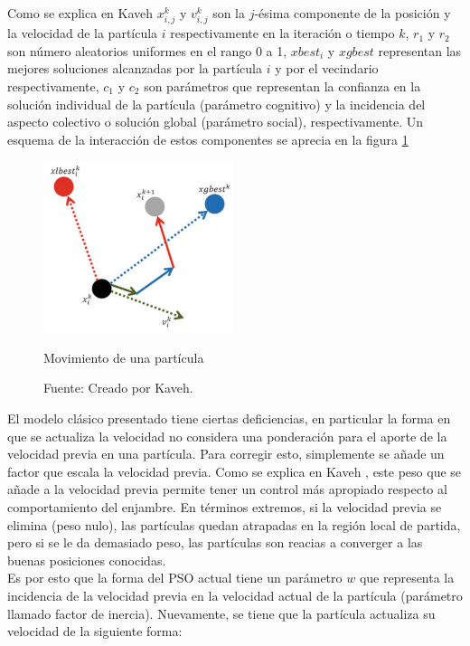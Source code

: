Como se explica en Kaveh \cite{Psoexplain14} $x_{i,j}^{k}$ y $v_{i,j}^{k}$ son la $j$-ésima componente de la posición y la velocidad de la partícula $i$ respectivamente en la iteración o tiempo $k$, $r_{1}$ y $r_{2}$ son número aleatorios uniformes en el rango 0 a 1, $xbest_i$ y $xgbest$ representan las mejores soluciones alcanzadas por la partícula $i$ y por el vecindario respectivamente, $c_1$ y $c_2$ son parámetros que representan la confianza en la solución individual de la partícula (parámetro cognitivo) y la incidencia del aspecto colectivo o solución global (parámetro social), respectivamente. Un esquema de la interacción de estos componentes se aprecia en la figura \ref{fig:move_part}\\
\begin{figure}[h!]
    \centering    
    \includegraphics[height=50mm]{figures/move_particle.png} 
    \caption{Movimiento de una partícula}
    \vspace{-.25cm} 
    \caption*{Fuente: Creado por Kaveh\cite{Psoexplain14}.}
    \label{fig:move_part}
\end{figure}
El modelo clásico presentado tiene ciertas deficiencias, en particular la forma en que se actualiza la velocidad no considera una ponderación para el aporte de la velocidad previa en una partícula. Para corregir esto, simplemente se añade un factor que escala la velocidad previa. Como se explica en Kaveh \cite{Psoexplain14}, este peso que se añade a la velocidad previa permite tener un control más apropiado respecto al comportamiento del enjambre. En términos extremos, si la velocidad previa se elimina (peso nulo), las partículas quedan atrapadas en la región local de partida, pero si se le da demasiado peso, las partículas son reacias a converger a las buenas posiciones conocidas.\\
Es por esto que la forma del PSO actual tiene un parámetro $w$ que representa la incidencia de la velocidad previa en la velocidad actual de la partícula (parámetro llamado factor de inercia). Nuevamente, se tiene que la partícula actualiza su velocidad de la siguiente forma: 
